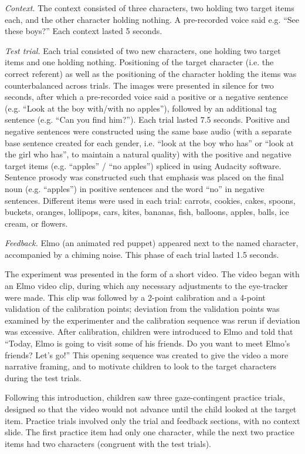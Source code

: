 \documentclass[man]{apa2}
\begin{document}
\emph{Context.}  The context consisted of three characters, two holding two target items each, and the other character holding nothing.  A pre-recorded voice said e.g. ``See these boys?''  Each context lasted 5 seconds.  

\emph{Test trial.}  Each trial consisted of two new characters, one holding two target items and one holding nothing.  Positioning of the target character (i.e. the correct referent) as well as the positioning of the character holding the items was counterbalanced across trials.  The images were presented in silence for two seconds, after which a pre-recorded voice said a positive or a negative sentence (e.g. ``Look at the boy with/with no apples''), followed by an additional tag sentence (e.g. ``Can you find him?''). Each trial lasted 7.5 seconds. Positive and negative sentences were constructed using the same base audio (with a separate base sentence created for each gender, i.e. ``look at the boy who has'' or ``look at the girl who has'', to maintain a natural quality) with the positive and negative target items (e.g. ``apples'' / ``no apples'') spliced in using Audacity software.  Sentence prosody was constructed such that emphasis was placed on the final noun (e.g. ``apples'') in positive sentences and the word ``no'' in negative sentences.  Different items were used in each trial: carrots, cookies, cakes, spoons, buckets, oranges, lollipops, cars, kites, bananas, fish, balloons, apples, balls, ice cream, or flowers.

\emph{Feedback.}  Elmo (an animated red puppet) appeared next to the named character, accompanied by a chiming noise. This phase of each trial lasted 1.5 seconds.  

The experiment was presented in the form of a short video.  The video began with an Elmo video clip, during which any necessary adjustments to the eye-tracker were made.  This clip was followed by a 2-point calibration and a 4-point validation of the calibration points; deviation from the validation points was examined by the experimenter and the calibration sequence was rerun if deviation was excessive.  After calibration, children were introduced to Elmo and told that ``Today, Elmo is going to visit some of his friends.  Do you want to meet Elmo's friends?  Let's go!''  This opening sequence was created to give the video a more narrative framing, and to motivate children to look to the target characters during the test trials.  

Following this introduction, children saw three gaze-contingent practice trials, designed so that the video would not advance until the child looked at the target item. Practice trials involved only the trial and feedback sections, with no context slide.  The first practice item had only one character, while the next two practice items had two characters (congruent with the test trials).  
\end{document}
